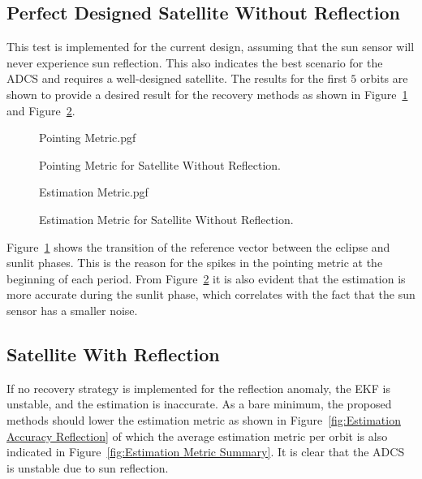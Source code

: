 \documentclass[letterpaper, 10 pt, conference]{ieeeconf}  %
\begin{document}
\subsection{Perfect Designed Satellite Without Reflection}
This test is implemented for the current design, assuming that the sun sensor will never experience sun reflection. This also indicates the best scenario for the ADCS and requires a well-designed satellite. The results for the first $5$ orbits are shown to provide a desired result for the recovery methods as shown in Figure~\ref{fig:Pointing Accuracy None} and Figure~\ref{fig:Estimation Accuracy None}. 
\begin{figure}[!htb]
	\begin{center}
		{Pointing Metric.pgf}
	\end{center}
	\caption[Pointing Metric for Satellite Without Reflection]{Pointing Metric for Satellite Without Reflection.}
	\label{fig:Pointing Accuracy None}
\end{figure}

\begin{figure}[!htb]
	\begin{center}
		{Estimation Metric.pgf}
	\end{center}
	\caption[Estimation Metric for Satellite Without Reflection]{Estimation Metric for Satellite Without Reflection.}
	\label{fig:Estimation Accuracy None}
\end{figure}

Figure~\ref{fig:Pointing Accuracy None} shows the transition of the reference vector between the eclipse and sunlit phases. This is the reason for the spikes in the pointing metric at the beginning of each period. From Figure~\ref{fig:Estimation Accuracy None} it is also evident that the estimation is more accurate during the sunlit phase, which correlates with the fact that the sun sensor has a smaller noise.

\subsection{Satellite With Reflection}
If no recovery strategy is implemented for the reflection anomaly, the EKF is unstable, and the estimation is inaccurate. As a bare minimum, the proposed methods should lower the estimation metric as shown in Figure~\ref{fig:Estimation Accuracy Reflection} of which the average estimation metric per orbit is also indicated in Figure~\ref{fig:Estimation Metric Summary}. It is clear that the ADCS is unstable due to sun reflection.
\end{document}
